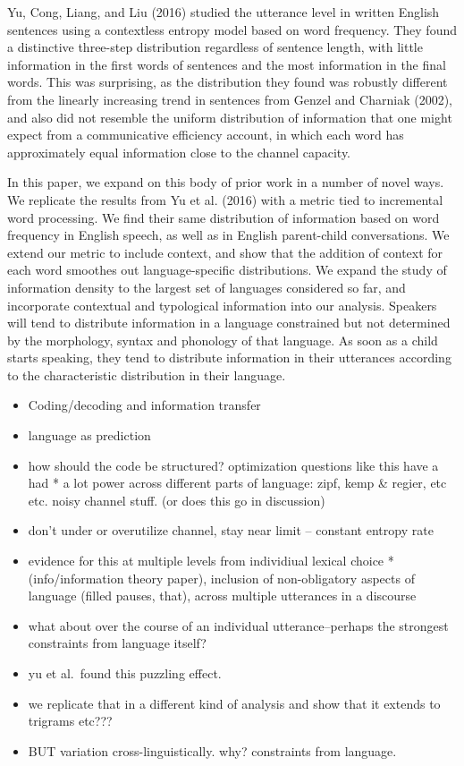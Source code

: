 \documentclass[man,floatsintext]{apa6}
\providecommand{\tightlist}{%
  \setlength{\itemsep}{0pt}\setlength{\parskip}{0pt}}
\begin{document}
Yu, Cong, Liang, and Liu (2016) studied the utterance level in written English sentences using a contextless entropy model based on word frequency. They found a distinctive three-step distribution regardless of sentence length, with little information in the first words of sentences and the most information in the final words. This was surprising, as the distribution they found was robustly different from the linearly increasing trend in sentences from Genzel and Charniak (2002), and also did not resemble the uniform distribution of information that one might expect from a communicative efficiency account, in which each word has approximately equal information close to the channel capacity.

In this paper, we expand on this body of prior work in a number of novel ways. We replicate the results from Yu et al. (2016) with a metric tied to incremental word processing. We find their same distribution of information based on word frequency in English speech, as well as in English parent-child conversations. We extend our metric to include context, and show that the addition of context for each word smoothes out language-specific distributions. We expand the study of information density to the largest set of languages considered so far, and incorporate contextual and typological information into our analysis. Speakers will tend to distribute information in a language constrained but not determined by the morphology, syntax and phonology of that language. As soon as a child starts speaking, they tend to distribute information in their utterances according to the characteristic distribution in their language.

\begin{itemize}
\tightlist
\item
  Coding/decoding and information transfer
\item
  language as prediction
\item
  how should the code be structured? optimization questions like this have a had * a lot power across different parts of language: zipf, kemp \& regier, etc etc. noisy channel stuff. (or does this go in discussion)
\item
  don't under or overutilize channel, stay near limit -- constant entropy rate
\item
  evidence for this at multiple levels from individiual lexical choice *(info/information theory paper), inclusion of non-obligatory aspects of language (filled pauses, that), across multiple utterances in a discourse
\item
  what about over the course of an individual utterance--perhaps the strongest constraints from language itself?
\item
  yu et al.~found this puzzling effect.
\item
  we replicate that in a different kind of analysis and show that it extends to trigrams etc???
\item
  BUT variation cross-linguistically. why? constraints from language.
\end{itemize}
\end{document}
